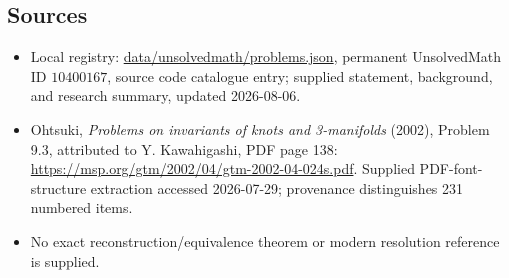 \documentclass[11pt]{article}
\begin{document}
\subsection{Sources}
\begin{itemize}
\item Local registry: \url{data/unsolvedmath/problems.json}, permanent UnsolvedMath ID \(10400167\), source code catalogue entry; supplied statement, background, and research summary, updated 2026-08-06.
\item Ohtsuki, \emph{Problems on invariants of knots and 3-manifolds} (2002), Problem 9.3, attributed to Y. Kawahigashi, PDF page 138: \url{https://msp.org/gtm/2002/04/gtm-2002-04-024s.pdf}. Supplied PDF-font-structure extraction accessed 2026-07-29; provenance distinguishes 231 numbered items.
\item No exact reconstruction/equivalence theorem or modern resolution reference is supplied.
\end{itemize}
\end{document}
